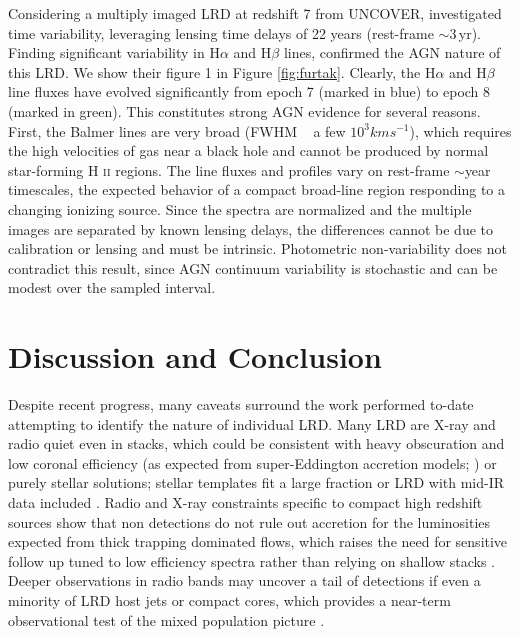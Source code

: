 \documentclass[utf8]{FrontiersinHarvard} %
\begin{document}
Considering a multiply imaged LRD at redshift 7 from UNCOVER, \citet{furtak2025investigating} investigated time variability, leveraging lensing time delays of 22 years (rest-frame $\sim3\,$yr). Finding significant variability in H$\alpha$ and H$\beta$ lines, \citet{furtak2023jwst} confirmed the AGN nature of this LRD. We show \citet{furtak2025investigating} their figure 1 in Figure \ref{fig:furtak}. Clearly, the H$\alpha$ and H$\beta$ line fluxes have evolved significantly from epoch 7 (marked in blue) to epoch 8 (marked in green). This constitutes strong AGN evidence for several reasons. First, the Balmer lines are very broad (FWHM ~ a few $10^3kms^{-1}$), which requires the high velocities of gas near a black hole and cannot be produced by normal star-forming H \textsc{ii} regions. The line fluxes and profiles vary on rest-frame $\sim$year timescales, the expected behavior of a compact broad-line region responding to a changing ionizing source. Since the spectra are normalized and the multiple images are separated by known lensing delays, the differences cannot be due to calibration or lensing and must be intrinsic. Photometric non-variability does not contradict this result, since AGN continuum variability is stochastic and can be modest over the sampled interval. 

\section{Discussion and Conclusion}
\label{sec:disc_and_conclude}
Despite recent progress, many caveats surround the work performed to-date attempting to identify the nature of individual LRD. Many LRD are X-ray and radio quiet even in stacks, which could be consistent with heavy obscuration and low coronal efficiency (as expected from super-Eddington accretion models; \citealt{secunda2025little}) or purely stellar solutions; stellar templates fit a large fraction or LRD with mid-IR data included \citep{hainline2025investigation}. 
Radio and X-ray constraints specific to compact high redshift sources show that non detections do not rule out accretion for the luminosities expected from thick trapping dominated flows, which raises the need for sensitive follow up tuned to low efficiency spectra rather than relying on shallow stacks \citep{latif2025radio}. Deeper observations in radio bands may uncover a tail of detections if even a minority of LRD host jets or compact cores, which provides a near-term observational test of the mixed population picture \citep{latif2025synergies}. 
\end{document}
